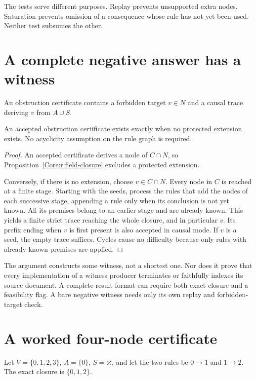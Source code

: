 The tests serve different purposes. Replay prevents unsupported extra nodes. Saturation prevents omission of a consequence whose rule has not yet been used. Neither test subsumes the other.

\section{A complete negative answer has a witness}
An obstruction certificate contains a forbidden target $v\in N$ and a causal trace deriving $v$ from $A\cup S$.

\begin{Coretheorem}\label{Core:r:field-obstruction}
An accepted obstruction certificate exists exactly when no protected extension exists. No acyclicity assumption on the rule graph is required.
\end{Coretheorem}
\begin{proof}
An accepted certificate derives a node of $C\cap N$, so Proposition~\ref{Core:r:field-closure} excludes a protected extension.

Conversely, if there is no extension, choose $v\in C\cap N$. Every node in $C$ is reached at a finite stage. Starting with the seeds, process the rules that add the nodes of each successive stage, appending a rule only when its conclusion is not yet known. All its premises belong to an earlier stage and are already known. This yields a finite strict trace reaching the whole closure, and in particular $v$. Its prefix ending when $v$ is first present is also accepted in causal mode. If $v$ is a seed, the empty trace suffices. Cycles cause no difficulty because only rules with already known premises are applied.
\end{proof}

The argument constructs some witness, not a shortest one. Nor does it prove that every implementation of a witness producer terminates or faithfully indexes its source document. A complete result format can require both exact closure and a feasibility flag. A bare negative witness needs only its own replay and forbidden-target check.

\section{A worked four-node certificate}
Let $V=\{0,1,2,3\}$, $A=\{0\}$, $S=\varnothing$, and let the two rules be $0\to1$ and $1\to2$. The exact closure is $\{0,1,2\}$.

